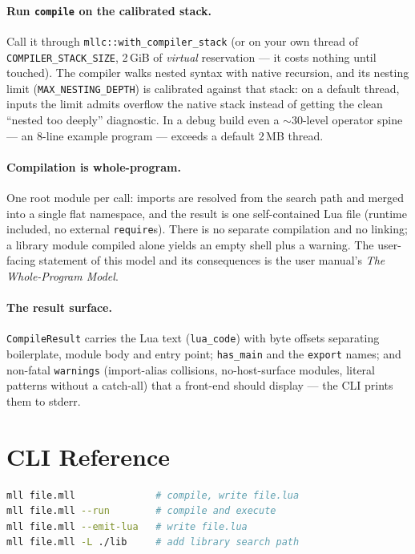 \documentclass[11pt,a4paper]{article}
\begin{document}
\paragraph{Run \texttt{compile} on the calibrated stack.}
Call it through \texttt{mllc::with\_compiler\_stack} (or on your own
thread of \texttt{COMPILER\_STACK\_SIZE}, 2\,GiB of \emph{virtual}
reservation --- it costs nothing until touched).  The compiler walks
nested syntax with native recursion, and its nesting limit
(\texttt{MAX\_NESTING\_DEPTH}) is calibrated against that stack: on a
default thread, inputs the limit admits overflow the native stack
instead of getting the clean ``nested too deeply'' diagnostic.  In a
debug build even a \(\sim\)30-level operator spine --- an 8-line
example program --- exceeds a default 2\,MB thread.

\paragraph{Compilation is whole-program.}
One root module per call: imports are resolved from the search path
and merged into a single flat namespace, and the result is one
self-contained Lua file (runtime included, no external
\texttt{require}s).  There is no separate compilation and no linking;
a library module compiled alone yields an empty shell plus a warning.
The user-facing statement of this model and its consequences is the
user manual's \emph{The Whole-Program Model}.

\paragraph{The result surface.}
\texttt{CompileResult} carries the Lua text (\texttt{lua\_code}) with
byte offsets separating boilerplate, module body and entry point;
\texttt{has\_main} and the \texttt{export} names; and non-fatal
\texttt{warnings} (import-alias collisions, no-host-surface modules,
literal patterns without a catch-all) that a front-end should
display --- the CLI prints them to stderr.

\section{CLI Reference}

\begin{lstlisting}[language=bash]
mll file.mll              # compile, write file.lua
mll file.mll --run        # compile and execute
mll file.mll --emit-lua   # write file.lua
mll file.mll -L ./lib     # add library search path
\end{lstlisting}
\end{document}
